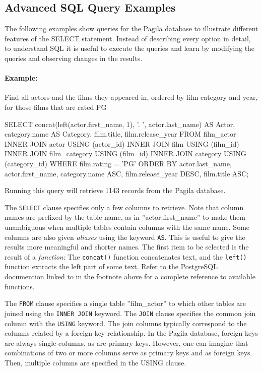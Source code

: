 \subsection*{Advanced SQL Query Examples}

The following examples show queries for the Pagila database to illustrate different features of the SELECT statement. Instead of describing every option in detail, to understand SQL it is useful to execute the queries and learn by modifying the queries and observing changes in the results. 

\paragraph{Example:} Find all actors and the films they appeared in, ordered by film category and year, for those films that are rated PG

\begin{sqlcode}
SELECT concat(left(actor.first_name, 1), '. ', 
           actor.last_name) AS Actor, 
       category.name AS Category, 
       film.title, 
       film.release_year
  FROM film_actor
  INNER JOIN actor USING (actor_id)
  INNER JOIN film USING (film_id)
  INNER JOIN film_category USING (film_id)
  INNER JOIN category USING (category_id)
  WHERE film.rating = 'PG'
  ORDER BY actor.last_name, 
           actor.first_name, 
           category.name ASC, 
           film.release_year DESC, 
           film.title ASC;
\end{sqlcode}

Running this query will retrieve 1143 records from the Pagila database. 

The \texttt{SELECT} clause specifies only a few columns to retrieve. Note that column names are prefixed by the table name, as in ''actor.first\_name'' to make them unambiguous when multiple tables contain columns with the same name. Some columns are also given \emph{aliases} using the keyword \texttt{AS}. This is useful to give the results more meaningful and shorter names. The first item to be selected is the result of a \emph{function}: The \texttt{concat()} function concatenates text, and the \texttt{left()} function extracts the left part of some text. Refer to the PostgreSQL documention linked to in the footnote above for a complete reference to available functions. 

The \texttt{FROM} clause specifies a single table ''film\_actor'' to which other tables are joined using the \texttt{INNER JOIN} keyword. The \texttt{JOIN} clause specifies the common join column with the \texttt{USING} keyword. The join columns typically correspond to the columns related by a foreign key relationship. In the Pagila database, foreign keys are always single columns, as are primary keys. However, one can imagine that combinations of two or more columns serve as primary keys and as foreign keys. Then, multiple columns are specified in the USING clause.

